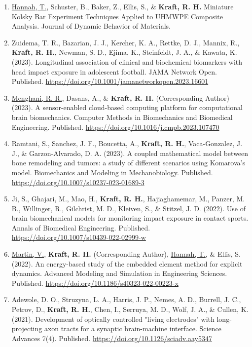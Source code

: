 \documentclass[a4paper,10pt]{article}
\begin{document}
\begin{enumerate}
\item \underline{Hannah, T.}, Schuster, B., Baker, Z., Ellis, S., \& \textbf{\textbf{Kraft,} R. H.} Miniature Kolsky Bar Experiment Techniques Applied to UHMWPE Composite Analysis. Journal of Dynamic Behavior of Materials.
\item Zuidema, T. R., Bazarian, J. J., Kercher, K. A., Rettke, D. J., Mannix, R., \textbf{\textbf{Kraft,} R. H.}, Newman, S. D., Ejima, K., Steinfeldt, J. A., \& Kawata, K. (2023). Longitudinal association of clinical and biochemical biomarkers with head impact exposure in adolescent football. JAMA Network Open. Published. \url{https://doi.org/10.1001/jamanetworkopen.2023.16601}
\item \underline{Menghani, R. R.}, Dasans, A., \& \textbf{\textbf{Kraft,} R. H.} (Corresponding Author) (2023). A sensor-enabled cloud-based computing platform for computational brain biomechanics. Computer Methods in Biomechanics and Biomedical Engineering. Published. \url{https://doi.org/10.1016/j.cmpb.2023.107470}
\item Ramtani, S., Sanchez, J. F., Boucetta, A., \textbf{\textbf{Kraft,} R. H.}, Vaca-Gonzalez, J. J., \& Garzon-Alvarado, D. A. (2023). A coupled mathematical model between bone remodeling and tumors: a study of different scenarios using Komarova's model. Biomechanics and Modeling in Mechanobiology. Published. \url{https://doi.org/10.1007/s10237-023-01689-3}
\item Ji, S., Ghajari, M., Mao, H., \textbf{\textbf{Kraft,} R. H.}, Hajiaghamemar, M., Panzer, M. B., Willinger, R., Gilchrist, M. D., Kleiven, S., \& Stitzel, J. D. (2022). Use of brain biomechanical models for monitoring impact exposure in contact sports. Annals of Biomedical Engineering. Published. \url{https://doi.org/10.1007/s10439-022-02999-w}
\item \underline{Martin, V.}, \textbf{\textbf{Kraft,} R. H.} (Corresponding Author), \underline{Hannah, T.}, \& Ellis, S. (2022). An energy-based study of the embedded element method for explicit dynamics. Advanced Modeling and Simulation in Engineering Sciences. Published. \url{https://doi.org/10.1186/s40323-022-00223-x}
\item Adewole, D. O., Struzyna, L. A., Harris, J. P., Nemes, A. D., Burrell, J. C., Petrov, D., \textbf{\textbf{Kraft,} R. H.}, Chen, I., Serruya, M. D., Wolf, J. A., \& Cullen, K. (2021). Development of optically controlled "living electrodes" with long-projecting axon tracts for a synaptic brain-machine interface. Science Advances 7(4). Published. \url{https://doi.org/10.1126/sciadv.aay5347}

\end{enumerate}
\end{document}
